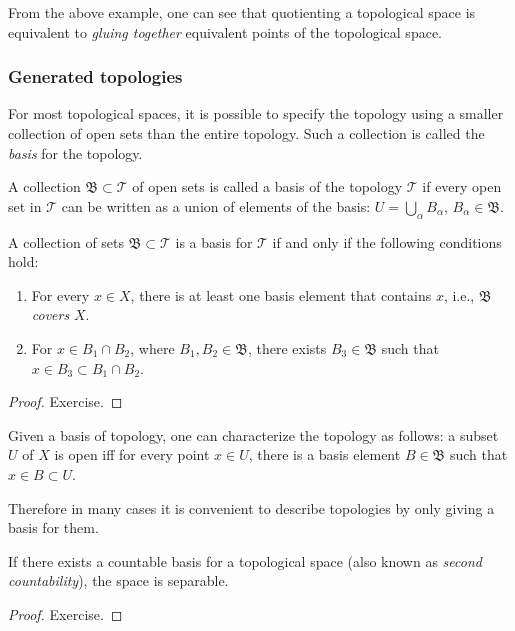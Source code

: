 From the above example, one can see that quotienting a topological space is equivalent to \emph{gluing together} equivalent points of the topological space.

\subsubsection{Generated topologies}

For most topological spaces, it is possible to specify the topology  using a smaller collection of open sets than the entire topology. Such a collection is called the \emph{basis} for the topology.

\begin{defn}[Basis]
A collection  $\mathfrak{B}\subset \mathcal{T}$ of open sets is called a basis of the topology $\mathcal{T}$ if every open set in $\mathcal{T}$ can be written as a union of elements of the basis: $U=\bigcup_\alpha B_\alpha$, $B_\alpha \in \mathfrak{B}$.
\end{defn}

\begin{prop}
A collection of sets $\mathfrak{B}\subset\mathcal{T}$ is a basis for $\mathcal{T}$ if and only if the following conditions hold:
\begin{enumerate}
    \item For every $x\in X$, there is at least one basis element that contains $x$, i.e., $\mathfrak{B}$ \emph{covers} $X$.
    \item For $x\in B_1 \cap B_2$, where $B_1,B_2\in\mathfrak{B}$, there exists $B_3\in\mathfrak{B}$ such that $x\in B_3\subset B_1\cap B_2 $.
\end{enumerate}
\end{prop}
\begin{proof}
Exercise.
\end{proof}
\begin{prop}\label{characterization of topology using basis}
Given a basis of topology, one can characterize the topology as follows: a subset $U$ of $X$ is open iff for every point $x\in U$, there is a basis element $B\in \mathfrak{B}$ such that $x\in B\subset U$.
\end{prop} 
Therefore in many cases it is convenient to describe topologies by only giving a basis for them.

\begin{prop}
If there exists a countable basis for a topological space (also known as \emph{second countability}), the space is separable.
\end{prop}
\begin{proof}
Exercise.
\end{proof}


